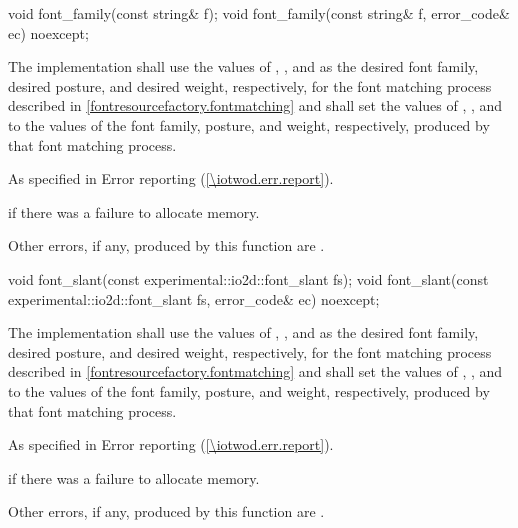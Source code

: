 \begin{itemdecl}
void font_family(const string& f);
void font_family(const string& f, error_code& ec) noexcept;
\end{itemdecl}
\begin{itemdescr}
\pnum
\effects
The implementation shall use the values of , , and  as the desired font family, desired posture, and desired weight, respectively, for the font matching process described in \ref{fontresourcefactory.fontmatching} and shall set the values of , , and  to the values of the font family, posture, and weight, respectively, produced by that font matching process.

\pnum
\throws
As specified in Error reporting (\ref{\iotwod.err.report}).

\pnum
\errors
{} if there was a failure to allocate memory.

\pnum
Other errors, if any, produced by this function are .
\end{itemdescr}

\begin{itemdecl}
void font_slant(const experimental::io2d::font_slant fs);
void font_slant(const experimental::io2d::font_slant fs, 
  error_code& ec) noexcept;
\end{itemdecl}
\begin{itemdescr}
\pnum
\effects
The implementation shall use the values of , , and  as the desired font family, desired posture, and desired weight, respectively, for the font matching process described in \ref{fontresourcefactory.fontmatching} and shall set the values of , , and  to the values of the font family, posture, and weight, respectively, produced by that font matching process.

\pnum
\throws
As specified in Error reporting (\ref{\iotwod.err.report}).

\pnum
\errors
{} if there was a failure to allocate memory.

\pnum
Other errors, if any, produced by this function are .
\end{itemdescr}

